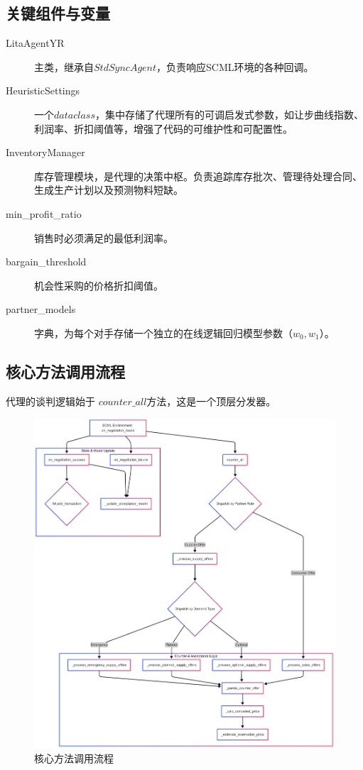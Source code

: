 \documentclass[12pt, a4paper]{article}
\begin{document}
\subsection{关键组件与变量}
\begin{description}
    \item[LitaAgentYR] 主类，继承自\textbf{$StdSyncAgent$}，负责响应SCML环境的各种回调。
    \item[HeuristicSettings] 一个\textbf{$dataclass$}，集中存储了代理所有的可调启发式参数，如让步曲线指数、利润率、折扣阈值等，增强了代码的可维护性和可配置性。
    \item[InventoryManager] 库存管理模块，是代理的决策中枢。负责追踪库存批次、管理待处理合同、生成生产计划以及预测物料短缺。
    \item[min\_profit\_ratio] 销售时必须满足的最低利润率。

    \item[bargain\_threshold] 机会性采购的价格折扣阈值。

    \item[partner\_models] 字典，为每个对手存储一个独立的在线逻辑回归模型参数（$w_0, w_1$）。
\end{description}

\subsection{核心方法调用流程}
代理的谈判逻辑始于 \textbf{$counter\_all$}方法，这是一个顶层分发器。

\begin{figure}
    \centering
    \includegraphics[width=0.75\linewidth]{Editor _ Mermaid Chart-2025-06-08-092514.png}
    \caption{核心方法调用流程}
    \label{fig:enter-label}
\end{figure}
\end{document}
